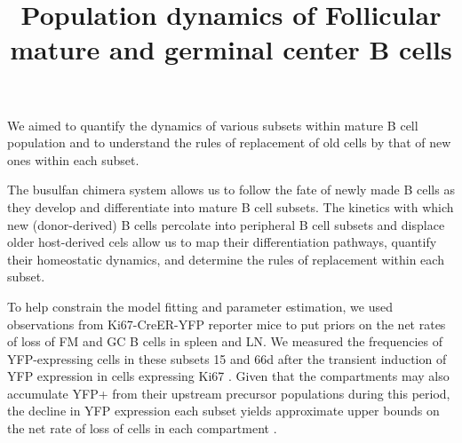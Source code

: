 \documentclass[11pt]{article}
\title{Population dynamics of  Follicular mature and germinal center B cells}
\author{}
\date{}
\newcommand{\red}[1]{{\color{red}{#1}}}
\newcommand{\looic}{$\Delta$LOO-IC}
\begin{document}
 
	\maketitle
	
	We aimed to quantify the dynamics of various subsets within mature B cell population and to understand the rules of replacement of old cells by that of new ones within each subset.
	
	
	
	
	
	
	
The busulfan chimera system allows us to follow the fate of newly made B cells as they develop and differentiate into mature B cell subsets. The kinetics with which new (donor-derived) B cells percolate into peripheral B cell subsets and displace older host-derived cels allow us to map their differentiation pathways, quantify their homeostatic dynamics, and determine the rules of replacement within each subset.
	
To help constrain the model fitting and parameter estimation,  we used observations from  Ki67-CreER-YFP reporter mice to put  priors on the net rates of loss of FM and GC B cells in spleen and LN. We measured  the frequencies of YFP-expressing cells  in these subsets  15 and 66d after the transient induction of YFP expression in cells expressing Ki67 \red{(Figure)}. Given that the compartments may also accumulate YFP+ from their upstream precursor populations during this period,  the decline in YFP expression each subset  yields approximate upper bounds on the net rate of loss of cells in each compartment \red{put these numbers on the YFP figure}.
	
\end{document}
